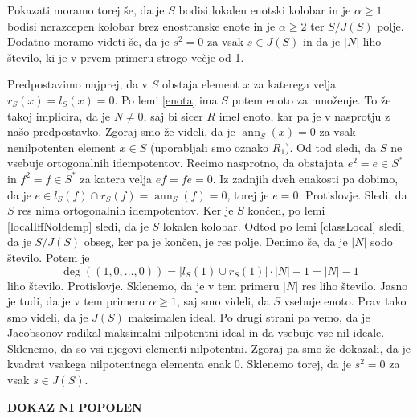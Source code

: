 \documentclass[a4paper, 12pt]{amsart}
\theoremstyle{definition} %
\theoremstyle{plain} %
\DeclareMathOperator{\ann}{ann}
\begin{document}
Pokazati moramo torej še, da je $S$ bodisi lokalen enotski kolobar in je $\alpha \ge 1$ bodisi nerazcepen kolobar brez enostranske enote in je $\alpha \ge 2$ ter $S/J(S)$ polje. Dodatno moramo videti še, da je $s^2 = 0$ za vsak $s\in J(S)$ in da je $|N|$ liho število, ki je v prvem primeru strogo večje od 1. 

Predpostavimo najprej, da v $S$ obstaja element $x$ za katerega velja $r_S(x) = l_S(x) = 0$. Po lemi \ref{enota} ima $S$ potem enoto za množenje. To že takoj implicira, da je $N\neq 0$, saj bi sicer $R$ imel enoto, kar pa je v nasprotju z našo predpostavko. Zgoraj smo že videli, da je $\ann_S(x) = 0$ za vsak nenilpotenten element $x\in S$ (uporabljali smo oznako $R_1$). Od tod sledi, da $S$ ne vsebuje ortogonalnih idempotentov. Recimo nasprotno, da obstajata $e^2 = e\in S^*$ in $f^2 = f\in S^*$ za katera velja $ef = fe=0$. Iz zadnjih dveh enakosti pa dobimo, da je $e\in l_S(f) \cap r_S(f) =\ann_S(f) = 0$, torej je $e=0$. Protislovje. Sledi, da $S$ res nima ortogonalnih idempotentov. Ker je $S$ končen, po lemi \ref{localIffNoIdemp} sledi, da je $S$ lokalen kolobar. Odtod po lemi \ref{classLocal} sledi, da je $S/J(S)$ obseg, ker pa je končen, je res polje. Denimo še, da je $|N|$ sodo število. Potem je 
$$
\deg((1,0,\dots,0)) = |l_S(1)\cup r_S(1)|\cdot |N| - 1 = |N| - 1
$$
liho število. Protislovje. Sklenemo, da je v tem primeru $|N|$ res liho število. Jasno je tudi, da je v tem primeru $\alpha \ge 1$, saj smo videli, da $S$ vsebuje enoto. Prav tako smo videli, da je $J(S)$ maksimalen ideal. Po drugi strani pa vemo, da je Jacobsonov radikal maksimalni nilpotentni ideal in da vsebuje vse nil ideale. Sklenemo, da so vsi njegovi elementi nilpotentni. Zgoraj pa smo že dokazali, da je kvadrat vsakega nilpotentnega elementa enak 0. Sklenemo torej, da je $s^2 = 0$ za vsak $s\in J(S)$.

{\bf DOKAZ NI POPOLEN}
\end{document}
